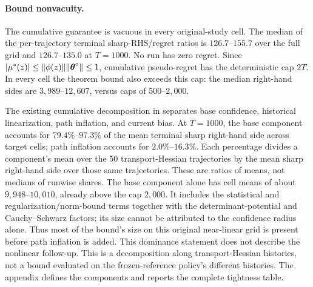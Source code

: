 \paragraph{Bound nonvacuity.}
The cumulative guarantee is vacuous in every original-study cell.  The median of the
per-trajectory terminal sharp-RHS/regret ratios is $126.7$--$155.7$ over the
full grid and $126.7$--$135.0$ at $T=1000$.  No run has zero regret.
Since $|\mu^*(z)|\le\|\phi(z)\|\|\boldsymbol{\theta}^\circ\|\le1$, cumulative
pseudo-regret has the deterministic cap $2T$.  In every cell the theorem bound
also exceeds this cap: the median right-hand sides are
$3{,}989$--$12{,}607$, versus caps of $500$--$2{,}000$.

The existing cumulative decomposition in
 separates base confidence,
historical linearization, path inflation, and current bias.  At $T=1000$,
the base component accounts for $79.4\%$--$97.3\%$ of the mean terminal
sharp right-hand side across target cells; path inflation accounts for
$2.0\%$--$16.3\%$.  Each percentage divides a component's mean over the
50 transport-Hessian trajectories by the mean sharp right-hand side over
those same trajectories.  These are ratios of means, not medians of runwise
shares.  The base component alone has cell means of about
$9{,}948$--$10{,}010$, already above the cap $2{,}000$.  It includes the
statistical and regularization/norm-bound terms together with the
determinant-potential and Cauchy--Schwarz factors; its size cannot be
attributed to the confidence radius alone.  Thus most of the bound's size
on this original near-linear grid is present before path inflation is added.
This dominance statement does not describe the nonlinear follow-up.  This is a
decomposition along transport-Hessian histories, not a bound evaluated on
the frozen-reference policy's different histories.  The appendix defines
the components and reports the complete tightness table.

